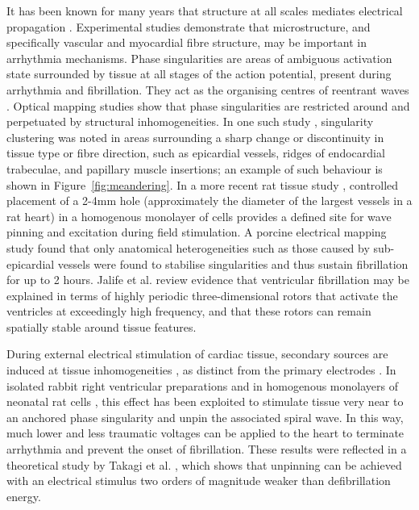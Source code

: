     It has been known for many years that structure at all scales mediates electrical propagation \cite{DeBakker2006}. Experimental studies demonstrate that microstructure, and specifically vascular and myocardial fibre structure, may be important in arrhythmia mechanisms. Phase singularities are areas of ambiguous activation state surrounded by tissue at all stages of the action potential, present during arrhythmia and fibrillation. They act as the organising centres of reentrant waves \cite{Gray1998}. Optical mapping studies show that phase singularities are restricted around and perpetuated by structural inhomogeneities. In one such study \cite{Valderrabano2003}, singularity clustering was noted in areas surrounding a sharp change or discontinuity in tissue type or fibre direction, such as epicardial vessels, ridges of endocardial trabeculae, and papillary muscle insertions; an example of such behaviour is shown in Figure~\ref{fig:meandering}. In a more recent rat tissue study \cite{Cysyk2008}, controlled placement of a 2-4mm hole (approximately the diameter of the largest vessels in a rat heart) in a homogenous monolayer of cells provides a defined site for wave pinning and excitation during field stimulation. A porcine electrical mapping study \cite{Qin2005} found that only anatomical heterogeneities such as those caused by sub-epicardial vessels were found to stabilise singularities and thus sustain fibrillation for up to 2 hours. Jalife et al. \cite{Jalife2000a} review evidence that ventricular fibrillation may be explained in terms of highly periodic three-dimensional rotors that activate the ventricles at exceedingly high frequency, and that these rotors can remain spatially stable around tissue features.

    During external electrical stimulation of cardiac tissue, secondary sources are induced at tissue inhomogeneities \cite{Sobie1997}, as distinct from the primary electrodes \cite{Roth1998}. In isolated rabbit right ventricular preparations \cite{Ripplinger2006} and in homogenous monolayers of neonatal rat cells \cite{Cysyk2008}, this effect has been exploited to stimulate tissue very near to an anchored phase singularity and unpin the associated spiral wave. In this way, much lower and less traumatic voltages can be applied to the heart to terminate arrhythmia and prevent the onset of fibrillation. These results were reflected in a theoretical study by Takagi et al. \cite{Takagi2004}, which shows that unpinning can be achieved with an electrical stimulus two orders of magnitude weaker than defibrillation energy.
    

